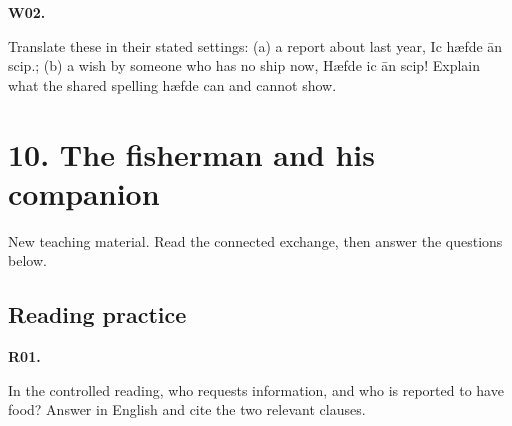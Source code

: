 \par\begin{minipage}{\linewidth}\raggedright
\textbf{W02.}

Translate these in their stated settings: (a) a report about last year, Ic hæfde ān scip.; (b) a wish by someone who has no ship now, Hæfde ic ān scip! Explain what the shared spelling hæfde can and cannot show.

\end{minipage}\par\addvspace{4pt}

\section*{10. The fisherman and his companion}

New teaching material. Read the connected exchange, then answer the questions below.

\par\begin{minipage}{\linewidth}\raggedright
{}
\end{minipage}\par

\subsection*{Reading practice}

\par\begin{minipage}{\linewidth}\raggedright
\textbf{R01.}

In the controlled reading, who requests information, and who is reported to have food? Answer in English and cite the two relevant clauses.

\end{minipage}\par\addvspace{4pt}

